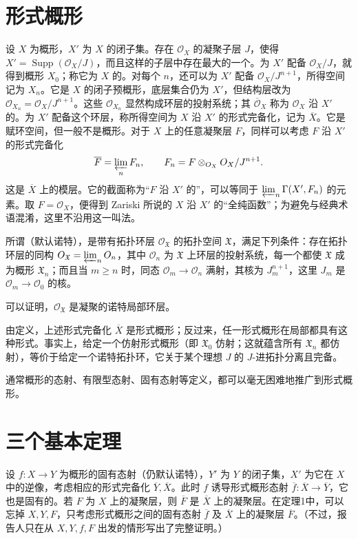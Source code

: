 \section{形式概形}
设 $X$ 为概形，$X'$ 为 $X$ 的闭子集。存在 $\mathcal O_X$ 的凝聚子层 $J$，使得 $X'=\operatorname{Supp}(\mathcal O_X/J)$，而且这样的子层中存在最大的一个。为 $X'$ 配备 $\mathcal O_X/J$，就得到概形 $X_0$；称它为 $X$ 的。对每个 $n$，还可以为 $X'$ 配备 $\mathcal O_X/J^{n+1}$，所得空间记为 $X_n$。它是 $X$ 的闭子预概形，底层集合仍为 $X'$，但结构层改为 $\mathcal O_{X_n}=\mathcal O_X/J^{n+1}$。这些 $\mathcal O_{X_n}$ 显然构成环层的投射系统；其 $\overline{\mathcal O}_X$ 称为 $\mathcal O_X$ 沿 $X'$ 的。为 $X'$ 配备这个环层，称所得空间为 $X$ 沿 $X'$ 的形式完备化，记为 $\overline X$。它是赋环空间，但一般不是概形。对于 $X$ 上的任意凝聚层 $F$，同样可以考虑 $F$ 沿 $X'$ 的形式完备化
\[
\overline F=\varprojlim_n F_n,\qquad
F_n=F\otimes_{\mathcal O_X}\mathcal O_X/J^{n+1}.
\]
这是 $\overline X$ 上的模层。它的截面称为“$F$ 沿 $X'$ 的”，可以等同于 $\varprojlim_n\Gamma(X',F_n)$ 的元素。取 $F=\mathcal O_X$，便得到 Zariski 所说的 $X$ 沿 $X'$ 的“全纯函数”；为避免与经典术语混淆，这里不沿用这一叫法。

所谓（默认诺特），是带有拓扑环层 $\mathcal O_{\mathfrak X}$ 的拓扑空间 $\mathfrak X$，满足下列条件：存在拓扑环层的同构 $\mathcal O_{\mathfrak X}=\varprojlim_n\mathcal O_n$，其中 $\mathcal O_n$ 为 $\mathfrak X$ 上环层的投射系统，每一个都使 $\mathfrak X$ 成为概形 $\mathfrak X_n$；而且当 $m\ge n$ 时，同态 $\mathcal O_m\to\mathcal O_n$ 满射，其核为 $J_m^{n+1}$，这里 $J_m$ 是 $\mathcal O_m\to\mathcal O_0$ 的核。

可以证明，$\mathcal O_{\mathfrak X}$ 是凝聚的诺特局部环层。

由定义，上述形式完备化 $\overline X$ 是形式概形；反过来，任一形式概形在局部都具有这种形式。事实上，给定一个仿射形式概形（即 $\mathfrak X_0$ 仿射；这就蕴含所有 $\mathfrak X_n$ 都仿射），等价于给定一个诺特拓扑环，它关于某个理想 $J$ 的 $J$-进拓扑分离且完备。

通常概形的态射、有限型态射、固有态射等定义，都可以毫无困难地推广到形式概形。

\section{三个基本定理}
设 $f:X\to Y$ 为概形的固有态射（仍默认诺特），$Y'$ 为 $Y$ 的闭子集，$X'$ 为它在 $X$ 中的逆像，考虑相应的形式完备化 $\overline Y,\overline X$。此时 $f$ 诱导形式概形态射 $\overline f:\overline X\to\overline Y$，它也是固有的。若 $F$ 为 $X$ 上的凝聚层，则 $\overline F$ 是 $\overline X$ 上的凝聚层。在定理1中，可以忘掉 $X,Y,F$，只考虑形式概形之间的固有态射 $\overline f$ 及 $\overline X$ 上的凝聚层 $\overline F$。（不过，报告人只在从 $X,Y,f,F$ 出发的情形写出了完整证明。）

